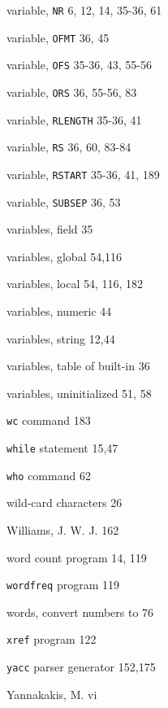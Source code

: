 \begin{multicols}{2}
variable, \verb'NR' 6, 12, 14, 35-36, 61

variable, \verb'OFMT' 36, 45

variable, \verb'OFS' 35-36, 43, 55-56

variable, \verb'ORS' 36, 55-56, 83

variable, \verb'RLENGTH' 35-36, 41

variable, \verb'RS' 36, 60, 83-84

variable, \verb'RSTART' 35-36, 41, 189

variable, \verb'SUBSEP' 36, 53

variables, field 35

variables, global 54,116

variables, local 54, 116, 182

variables, numeric 44

variables, string 12,44

variables, table of built-in 36

variables, uninitialized 51, 58

\verb'wc' command 183

\verb'while' statement 15,47

\verb'who' command 62

wild-card characters 26

Williams, J. W. J. 162

word count program 14, 119

\verb'wordfreq' program 119

words, convert numbers to 76

\verb'xref' program 122

\verb'yacc' parser generator 152,175

Yannakakis, M. vi

\end{multicols}
